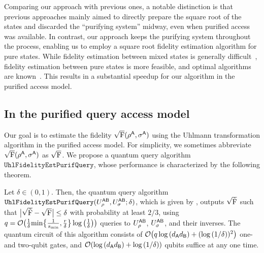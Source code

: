 Comparing our approach with previous ones, a notable distinction is that previous approaches mainly aimed to directly prepare the square root of the states and discarded the ``purifying system'' midway, even when purified access was available.
In contrast, our approach keeps the purifying system throughout the process, enabling us to employ a square root fidelity estimation algorithm for pure states.
While fidelity estimation between mixed states is generally difficult~\cite{gilyen2022improvedfidelity, Rethinasamy2023estimatingdist}, fidelity estimation between pure states is more feasible, and optimal algorithms are known~\cite{Wang2024OptimalFidelityPure, wang2024sampleoptimal,Fang2025OptimalFidelityToPure}.
This results in a substantial speedup for our algorithm in the purified access model.















\subsection{In the purified query access model}
\label{sec:fidelity estimation PQA}


Our goal is to estimate the fidelity $\sqrt{{\mathrm{F}}}(\rho^{\mathsf{A}}, \sigma^{\mathsf{A}})$ using the Uhlmann transformation algorithm in the purified access model.
For simplicity, we sometimes abbreviate $\sqrt{{\mathrm{F}}}(\rho^{\mathsf{A}}, \sigma^{\mathsf{A}})$ as $\sqrt{{\mathrm{F}}}$.
We propose a quantum query algorithm $\mathtt{UhlFidelityEstPurifQuery}$, whose performance is 
characterized by the following theorem.

\begin{theorem}
\label{thm:fid est quel}
Let $\delta \in (0, 1)$. Then, the quantum query algorithm $\mathtt{UhlFidelityEstPurifQuery}(U_\rho^{{\mathsf{A}}{\mathsf{B}}}, U_\sigma^{{\mathsf{A}}{\mathsf{B}}}; \delta)$,
which is given by , outputs $\sqrt{\tilde{{\mathrm{F}}}}$ such that $\big|\sqrt{\tilde{{\mathrm{F}}}} - \sqrt{{\mathrm{F}}}\big| \leq \delta$ with probability at least $2/3$, using $q = {\mathcal{O}}\big(\frac{1}{\delta}{\rm min}\big\{\frac{1}{s_{\rm min}}, \frac{r}{\delta}\big\}\log{\big(\frac{1}{\delta}\big)}\big)$ queries to $U_\rho^{{\mathsf{A}}{\mathsf{B}}}$, $U_\sigma^{{\mathsf{A}}{\mathsf{B}}}$, and their inverses. 
The quantum circuit of this algorithm consists of ${\mathcal{O}}\big(q\log{(d_{\mathsf{A}}d_{\mathsf{B}})} + (\log{(1/\delta}))^2\big)$ one- and two-qubit gates, and ${\mathcal{O}}(\log{(d_{\mathsf{A}}d_{\mathsf{B}})} + \log{(1/\delta}))$ qubits suffice at any one time.
\end{theorem}


